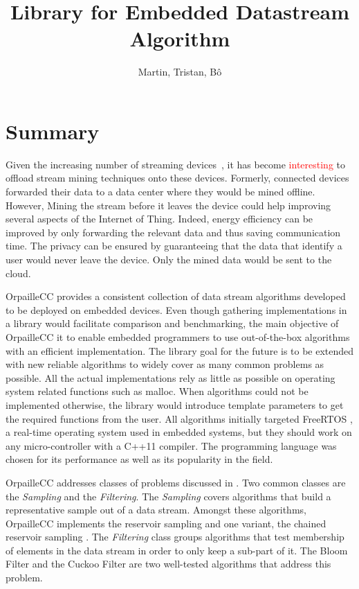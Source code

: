 \documentclass{article}
\title{Library for Embedded Datastream Algorithm}
\author{Martin, Tristan, Bô}
\begin{document}
\maketitle
\section{Summary}
Given the increasing number of streaming devices~\cite{growing-iot}, it has
become \textcolor{red}{interesting} to offload stream mining techniques onto
these devices.  Formerly, connected devices forwarded their data to a data
center where they would be mined offline.  However, Mining the stream before it
leaves the device could help improving several aspects of the Internet of
Thing. Indeed, energy efficiency can be improved by only forwarding the
relevant data and thus saving communication time. The privacy can be ensured by
guaranteeing that the data that identify a user would never leave the device.
Only the mined data would be sent to the cloud.

OrpailleCC provides a consistent collection of data stream algorithms developed
to be deployed on embedded devices. Even though gathering implementations in a
library would facilitate comparison and benchmarking, the main objective of
OrpailleCC it to enable embedded programmers to use out-of-the-box algorithms
with an efficient implementation.  The library goal for the future is to be
extended with new reliable algorithms to widely cover as many common problems
as possible.  All the actual implementations rely as little as possible on
operating system related functions such as malloc. When algorithms could not be
implemented otherwise, the library would introduce template parameters to get
the required functions from the user.  All algorithms initially targeted
FreeRTOS \cite{freertos}, a real-time operating system used in embedded
systems, but they should work on any micro-controller with a C++11 compiler.
The programming language was chosen for its performance as well as its
popularity in the field.

OrpailleCC addresses classes of problems discussed in \cite{kejariwal2015}. Two
common classes are the \textit{Sampling} and the \textit{Filtering}.  The
\textit{Sampling} covers algorithms that build a representative sample out of a
data stream. Amongst these algorithms, OrpailleCC implements the reservoir
sampling \cite{reservoir_sampling} and one variant, the chained reservoir
sampling \cite{chained_reservoir_sampling}.  The \textit{Filtering} class
groups algorithms that test membership of elements in the data stream in order
to only keep a sub-part of it. The Bloom Filter \cite{bloom} and the Cuckoo
Filter \cite{cuckoo_filter} are two well-tested algorithms that address this
problem.
\end{document}
